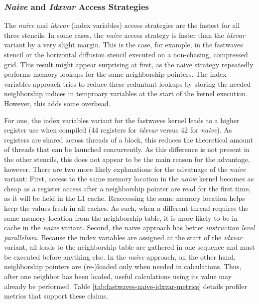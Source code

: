 \subsubsection{\emph{Naive} and \emph{Idxvar} Access Strategies}
The \emph{naive} and \emph{idxvar} (index variables) access strategies are the fastest for all three stencils. In some cases, the \emph{naive} access strategy is faster than the \emph{idxvar} variant by a very slight margin. This is the case, for example, in the fastwaves stencil or the horizontal diffusion stencil executed on a non-chasing, compressed grid. This result might appear surprising at first, as the naive strategy repeatedly performs memory lookups for the same neighborship pointers. The index variables approach tries to reduce these reduntant lookups by storing the needed neighborship indices in temproary variables at the start of the kernel execution. However, this adds some overhead.

For one, the index variables variant for the fastwaves kernel leads to a higher register use when compiled (44 registers for \emph{idxvar} versus 42 for \emph{naive}). As registers are shared across threads of a block, this reduces the theoretical amount of threads that can be launched concurrently. As this difference is not present in the other stencils, this does not appear to be the main reason for the advantage, however. There are two more likely explanations for the advatnage of the \emph{naive} variant: First, access to the same memory location in the \emph{naive} kernel becomes as cheap as a register access after a neighborship pointer are read for the first time, as it will be held in the L1 cache. Reaccessing the same memory location helps keep the values fresh in all caches. As such, when a different thread requires the same memory location from the neighborship table, it is more likely to be in cache in the \emph{naive} variant. Second, the naive approach has better \emph{instruction level parallelism}. Because the index variables are assigned at the start of the \emph{idxvar} variant, all loads to the neighborship table are gathered in one sequence and must be executed before anything else. In the \emph{naive} approach, on the other hand, neighborship pointers are (re-)loaded only when needed in calculations. Thus, after one neighbor has been loaded, useful calculations using its value may already be performed. Table \ref{tab:fastwaves-naive-idxvar-metrics} details profiler metrics that support these claims.


